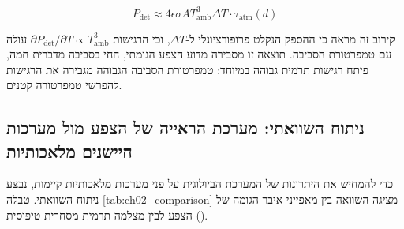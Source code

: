 \begin{equation}
P_{\text{det}} \approx 4 \epsilon \sigma A T_{\text{amb}}^3 \Delta T \cdot \tau_{\text{atm}}(d)
\label{eq:ch02_linearized_power}
\end{equation}

קירוב זה מראה כי ההספק הנקלט פרופורציונלי ל-$\Delta T$, וכי הרגישות $\partial P_{\text{det}} / \partial T \propto T_{\text{amb}}^3$ עולה עם טמפרטורת הסביבה. תוצאה זו מסבירה מדוע הצפע הגומתי, החי בסביבה מדברית חמה, פיתח רגישות תרמית גבוהה במיוחד: טמפרטורת הסביבה הגבוהה מגבירה את הרגישות להפרשי טמפרטורה קטנים.

\subsection{ניתוח השוואתי: מערכת הראייה של הצפע מול מערכות חיישנים מלאכותיות}
\label{sec:ch02_comparative_analysis}

כדי להמחיש את היתרונות של המערכת הביולוגית על פני מערכות מלאכותיות קיימות, נבצע ניתוח השוואתי. טבלה \ref{tab:ch02_comparison} מציגה השוואה בין מאפייני איבר הגומה של הצפע לבין מצלמה תרמית מסחרית טיפוסית ().

\begin{table}[htbp]
\centering
\caption{השוואה בין איבר הגומה של הצפע הגומתי לבין מצלמה תרמית מסחרית. (Comparison between pit viper pit organ and commercial thermal camera.)}
\label{tab:ch02_comparison}
\end{table}

